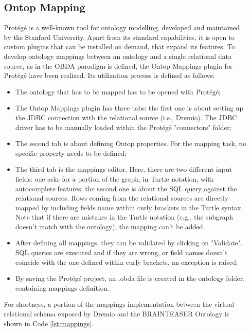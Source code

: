 \subsection{Ontop Mapping}
Protégé is a well-known tool for ontology modelling, developed and maintained by the Stanford University. Apart from its standard capabilities, it is open to custom plugins that can be installed on demand, that expand its features.
To develop ontology mappings between an ontology and a single relational data source, as in the \ac{OBDA} paradigm is defined, the Ontop Mappings plugin for Protégé have been realized. Its utilization process is defined as follows:
\begin{itemize}
  \item The ontology that has to be mapped has to be opened with Protégé;
  \item The Ontop Mappings plugin has three tabs: the first one is about setting up the \ac{JDBC} connection with the relational source (i.e., Dremio). The \ac{JDBC} driver has to be manually loaded within the Protégé "connectors" folder;
  \item The second tab is about defining Ontop properties. For the mapping task, no specific property needs to be defined;
  \item The third tab is the mappings editor. Here, there are two different input fields: one asks for a portion of the graph, in Turtle notation, with autocomplete features; the second one is about the \ac{SQL} query against the relational sources. Rows coming from the relational sources are directly mapped by including fields name within curly brackets in the Turtle syntax. Note that if there are mistakes in the Turtle notation (e.g., the subgraph doesn't match with the ontology), the mapping can't be added.
  \item After defining all mappings, they can be validated by clicking on "Validate". \ac{SQL} queries are executed and if they are wrong, or field names doesn't coincide with the one defined within curly brackets, an exception is raised;
  \item By saving the Protégé project, an .obda file is created in the ontology folder, containing mappings definition.
\end{itemize}  

For shortness, a portion of the mappings implementation between the virtual relational schema exposed by Dremio and the \ac{BRAINTEASER} Ontology is shown in Code \ref{lst:mappings}.

